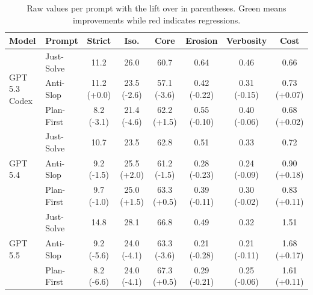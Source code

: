 \begin{table}[t]
    \centering
    \caption{Raw values per prompt with the lift over \justsolve{} in parentheses. \textcolor{good}{Green} means improvements while \textcolor{bad}{red} indicates regressions.}
    \label{tab:prompt-strategy-lift}
    \footnotesize
    \setlength{\tabcolsep}{5pt}
    \begin{tabular}{llcccccc}
        \toprule
        Model & Prompt & Strict & Iso. & Core & Erosion & Verbosity & Cost \\
        \midrule
        \multirow{3}{*}{GPT 5.3 Codex} & Just-Solve & 11.2 & 26.0 & 60.7 & 0.64 & 0.46 & 0.66 \\
         & Anti-Slop & 11.2 (+0.0) & 23.5 (\textcolor{bad}{-2.6}) & 57.1 (\textcolor{bad}{-3.6}) & 0.42 (\textcolor{good}{-0.22}) & 0.31 (\textcolor{good}{-0.15}) & 0.73 (\textcolor{bad}{+0.07}) \\
         & Plan-First & 8.2 (\textcolor{bad}{-3.1}) & 21.4 (\textcolor{bad}{-4.6}) & 62.2 (\textcolor{good}{+1.5}) & 0.55 (\textcolor{good}{-0.10}) & 0.40 (\textcolor{good}{-0.06}) & 0.68 (\textcolor{bad}{+0.02}) \\
        \midrule
        \multirow{3}{*}{GPT 5.4} & Just-Solve & 10.7 & 23.5 & 62.8 & 0.51 & 0.33 & 0.72 \\
         & Anti-Slop & 9.2 (\textcolor{bad}{-1.5}) & 25.5 (\textcolor{good}{+2.0}) & 61.2 (\textcolor{bad}{-1.5}) & 0.28 (\textcolor{good}{-0.23}) & 0.24 (\textcolor{good}{-0.09}) & 0.90 (\textcolor{bad}{+0.18}) \\
         & Plan-First & 9.7 (\textcolor{bad}{-1.0}) & 25.0 (\textcolor{good}{+1.5}) & 63.3 (\textcolor{good}{+0.5}) & 0.39 (\textcolor{good}{-0.11}) & 0.30 (\textcolor{good}{-0.02}) & 0.83 (\textcolor{bad}{+0.11}) \\
        \midrule
        \multirow{3}{*}{GPT 5.5} & Just-Solve & 14.8 & 28.1 & 66.8 & 0.49 & 0.32 & 1.51 \\
         & Anti-Slop & 9.2 (\textcolor{bad}{-5.6}) & 24.0 (\textcolor{bad}{-4.1}) & 63.3 (\textcolor{bad}{-3.6}) & 0.21 (\textcolor{good}{-0.28}) & 0.21 (\textcolor{good}{-0.11}) & 1.68 (\textcolor{bad}{+0.17}) \\
         & Plan-First & 8.2 (\textcolor{bad}{-6.6}) & 24.0 (\textcolor{bad}{-4.1}) & 67.3 (\textcolor{good}{+0.5}) & 0.29 (\textcolor{good}{-0.21}) & 0.25 (\textcolor{good}{-0.06}) & 1.61 (\textcolor{bad}{+0.11}) \\
        \bottomrule
    \end{tabular}
\end{table}
